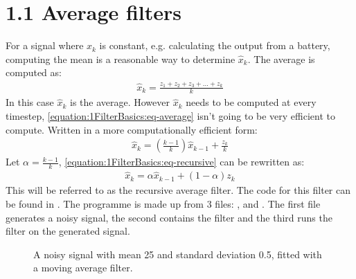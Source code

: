 \documentclass[letterpaper,10pt,english]{jupyterBook}
\begin{document}
\section{1.1 Average filters}
\label{\detokenize{1FilterBasics:average-filters}}
\sphinxAtStartPar
For a signal where \(x_k\) is constant, e.g. calculating the output from a battery, computing the mean is a reasonable way to determine \(\hat{x}_k\). The average is computed as:
\begin{equation}\label{equation:1FilterBasics:eq-average}
\begin{split}\hat{x}_k = \frac{z_1+z_2+z_3+...+z_k}{k}\end{split}
\end{equation}
\sphinxAtStartPar
In this case \(\hat{x}_k\) is the average. However \(\hat{x}_k\) needs to be computed at every time\sphinxhyphen{}step, \eqref{equation:1FilterBasics:eq-average} isn’t going to be very efficient to compute. Written in a more computationally efficient form:
\begin{equation}\label{equation:1FilterBasics:eq-recursive}
\begin{split}\hat{x}_k = \left(\frac{k-1}{k}\right)\hat{x}_{k-1} + \frac{z_k}{k}\end{split}
\end{equation}
\sphinxAtStartPar
Let \(\alpha = \frac{k-1}{k}\), \eqref{equation:1FilterBasics:eq-recursive} can be rewritten as:
\begin{equation}\label{equation:1FilterBasics:eq-alpha}
\begin{split}\hat{x}_k = \alpha \hat{x}_{k-1} + (1 - \alpha) z_k\end{split}
\end{equation}
\sphinxAtStartPar
This will be referred to as the recursive average filter.
The code for this filter can be found in . The programme is made up from 3 files: ,  and . The first file generates a noisy signal, the second contains the filter and the third runs the filter on the generated signal.

\begin{figure}[htbp]
\centering
\capstart

\noindent{}
\caption{A noisy signal with mean 25 and standard deviation 0.5, fitted with a moving average filter.}\label{\detokenize{1FilterBasics:fig-noisy-signal}}\end{figure}
\end{document}

